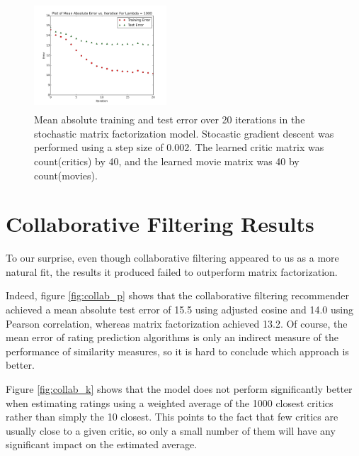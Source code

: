 \documentclass[12pt]{article}
\newcommand{\matrixtesterror}{13.2}
\newcommand{\factwidth}{0.44}
\newcommand{\factheight}{1.6in}
\begin{document}
\begin{figure}[H]
\includegraphics[width=0\factwidth\textwidth,height=\factheight]{matrix_plots/test-i40d40l1000.png}
\caption{Mean absolute training and test error over 20 iterations in the stochastic matrix factorization model. Stocastic gradient descent was performed using a step size of 0.002. The learned critic matrix was count(critics) by 40, and the learned movie matrix was 40 by count(movies).}
\label{fig:fac-d40}
\end{figure}



\section{Collaborative Filtering Results}

To our surprise, even though collaborative filtering appeared to us as a more
natural fit, the results it produced failed to outperform matrix factorization.

Indeed, figure \ref{fig:collab_p}  shows that the collaborative filtering
recommender achieved a mean absolute test
error of 15.5 using adjusted cosine and 14.0 using Pearson correlation, whereas
matrix factorization achieved \matrixtesterror. Of course, the mean error of
rating prediction algorithms is only an indirect measure of the performance of
similarity measures, so it is hard to conclude which approach is better.

Figure \ref{fig:collab_k} shows that the model does not perform significantly
better when estimating ratings using
a weighted average of the 1000 closest critics rather than simply the 10
closest. This points to the fact that few critics are usually close to a given
critic, so only a small number of them will have any significant impact on
the estimated average.
\end{document}
